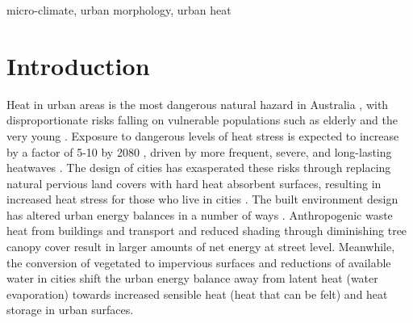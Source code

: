 \documentclass[final,3p,times,authoryear]{elsarticle}
\begin{document}
\begin{keyword}
micro-climate\sep 
urban morphology\sep
urban heat
\end{keyword}



\maketitle





\section{Introduction}
Heat in urban areas is the most dangerous natural hazard in Australia \citep{Coates2014}, with disproportionate risks falling on vulnerable populations such as elderly and the very young \citep{Nicholls2008}. Exposure to dangerous levels of heat stress is expected to increase by a factor of 5-10 by 2080 \citep{Coffel2018}, driven by more frequent, severe, and long-lasting heatwaves \citep{IPCC2013a}.  The design of cities has exasperated these risks through replacing natural pervious land covers with hard heat absorbent surfaces, resulting in increased heat stress for those who live in cities \citep{Coutts2012,Martilli2020}. The built environment design has altered urban energy balances in a number of ways \citep{Oke1982}. Anthropogenic waste heat from buildings and transport and reduced shading through diminishing tree canopy cover result in larger amounts of net energy at street level. Meanwhile, the conversion of vegetated to impervious surfaces and reductions of available water in cities shift the urban energy balance away from latent heat (water evaporation) towards increased sensible heat (heat that can be felt) and heat storage in urban surfaces. 
\end{document}
